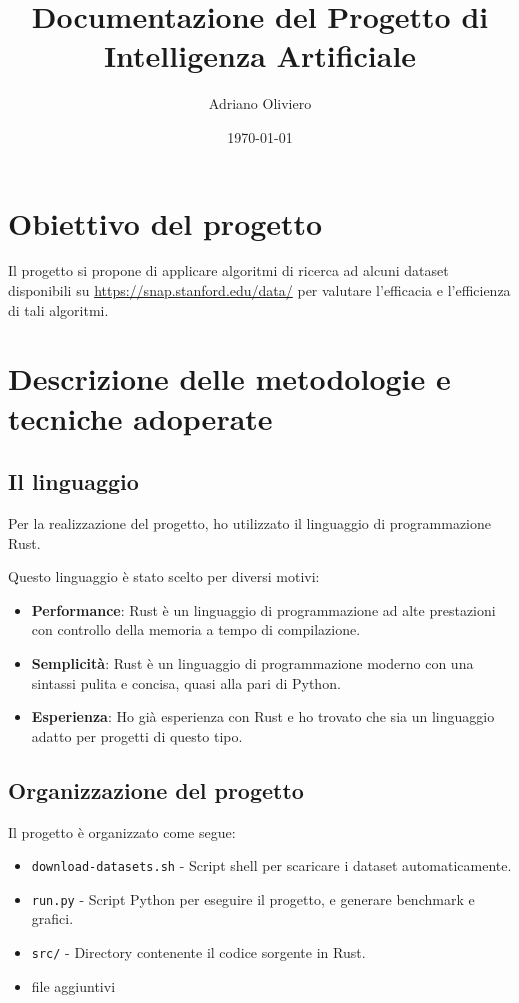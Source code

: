 \documentclass{ol-softwaremanual}
\title{Documentazione del Progetto di Intelligenza Artificiale}
\author{Adriano Oliviero}
\date{\today}
\begin{document}
\maketitle

\tableofcontents
\newpage
\section{Obiettivo del progetto}
Il progetto si propone di applicare algoritmi di ricerca ad alcuni dataset disponibili su
\url{https://snap.stanford.edu/data/} per valutare l'efficacia e l'efficienza di tali algoritmi.

\section{Descrizione delle metodologie e tecniche adoperate}
\subsection{Il linguaggio}
Per la realizzazione del progetto, ho utilizzato il linguaggio di programmazione Rust.

Questo linguaggio è stato scelto per diversi motivi:
\begin{itemize}
	\item \textbf{Performance}: Rust è un linguaggio di programmazione ad alte prestazioni con controllo della memoria a tempo di compilazione.
	\item \textbf{Semplicità}: Rust è un linguaggio di programmazione moderno con una sintassi pulita e concisa, quasi alla pari di Python.
	\item \textbf{Esperienza}: Ho già esperienza con Rust e ho trovato che sia un linguaggio adatto per progetti di questo tipo.
\end{itemize}

\subsection{Organizzazione del progetto}
Il progetto è organizzato come segue:
\begin{itemize}
	\item \texttt{download-datasets.sh} - Script shell per scaricare i dataset automaticamente.
	\item \texttt{run.py} - Script Python per eseguire il progetto, e generare benchmark e grafici.
	\item \texttt{src/} - Directory contenente il codice sorgente in Rust.
	\item file aggiuntivi
\end{itemize}
\end{document}
